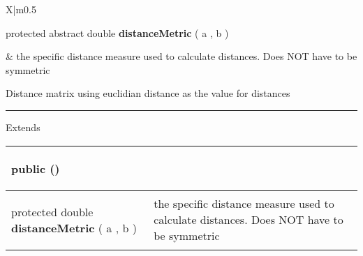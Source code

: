 {\begin{tabularx}{\linewidth}{X|m{0.5\textwidth}}
\begin{raggedleft}protected abstract double \textbf{distanceMetric }(\newline \hfill 
\hspace*{ 5pt} \textbf{\hyperref[tab:Sensor]{\color{blue}{Sensor}}} a , \newline
 \hspace*{ 5pt} \textbf{\hyperref[tab:Sensor]{\color{blue}{Sensor}}} b  )
\end{raggedleft} &
 the specific distance measure used to calculate distances. Does NOT have to be symmetric\\\end{tabularx}
}
 {\scriptsize Distance matrix using euclidian distance as the value for distances
 
\vspace*{4pt} \hrule \vspace*{3pt}
Extends \textbf{ \hyperref[tab:DistanceMatrix]{\color{blue}{DistanceMatrix}} }
\vspace*{-5pt} 
\begin{tabularx}{\linewidth}{X|m{}}
\label{tab:EuclidianDistanceMatrix}
\begin{raggedleft}public  \textbf{\hyperref[tab:EuclidianDistanceMatrix]{\color{blue}{EuclidianDistanceMatrix}}}()
\end{raggedleft} &
 \\ \hline 
\begin{raggedleft}protected double \textbf{distanceMetric }(\newline \hfill 
\hspace*{ 5pt} \textbf{\hyperref[tab:Sensor]{\color{blue}{Sensor}}} a , \newline
 \hspace*{ 5pt} \textbf{\hyperref[tab:Sensor]{\color{blue}{Sensor}}} b  )
\end{raggedleft} &
 the specific distance measure used to calculate distances. Does NOT have to be symmetric\\\end{tabularx}
}
